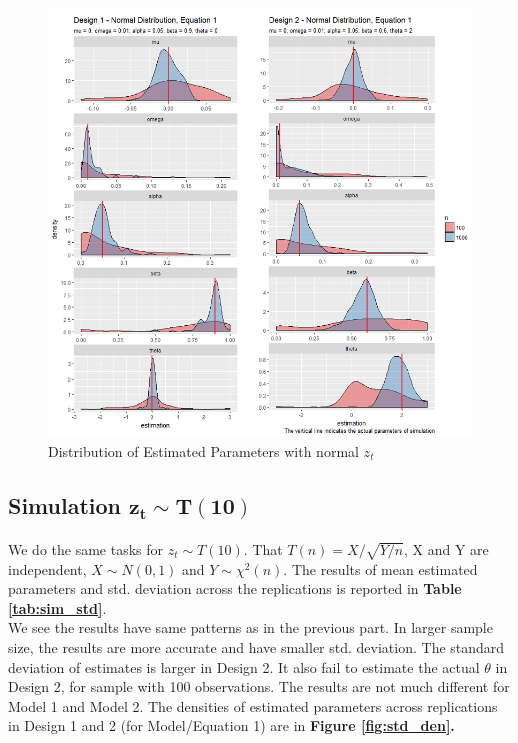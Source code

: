 \documentclass[a4paper]{article}
\begin{document}
\begin{figure}[h]
\centering
\includegraphics[height=0.5\textheight]{Norm_eq1.png}
\caption{\label{fig:den_norm} Distribution of Estimated Parameters with normal $z_t$}
\end{figure}

\subsection{Simulation $\mathbf{z_t \sim T(10)}$}

\paragraph*{}
We do the same tasks for $z_t \sim T(10)$. That $T(n) = X / \sqrt{Y/n}$, X and Y are independent, $X \sim N(0,1)$ and $Y \sim \chi^2(n)$. The results of mean estimated parameters and std. deviation across the replications is reported in \textbf{Table \ref{tab:sim_std}}. \\

We see the results have same patterns as in the previous part. In larger sample size, the results are more accurate and have smaller std. deviation. The standard deviation of estimates is larger in Design 2. It also fail to estimate the actual $\theta$ in Design 2, for sample with 100 observations. The results are not much different for Model 1 and Model 2. The densities of estimated parameters across replications in Design 1 and 2 (for Model/Equation 1) are in \textbf{Figure \ref{fig:std_den}.}
\end{document}
